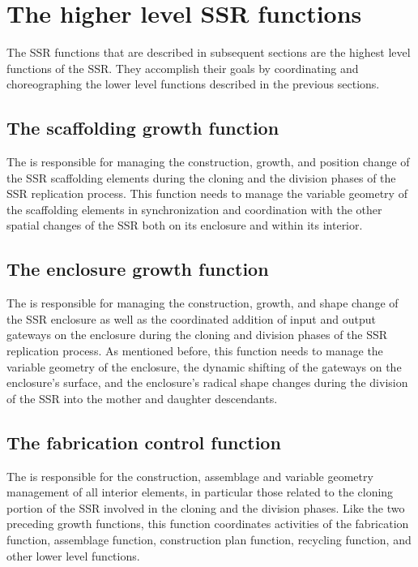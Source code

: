\section[The higher level SSR functions]{The higher level SSR functions}

The SSR functions that are
described in subsequent sections are the highest level functions of the
SSR. They accomplish their goals by coordinating and choreographing the
lower level functions described in the previous sections.

\subsection[The scaffolding growth function]{The scaffolding growth function}

The  
is responsible for managing the construction, growth, and
position change of the SSR scaffolding elements during the cloning and
the division phases of the SSR replication process. This function needs to
manage the variable geometry of the scaffolding elements in
synchronization and coordination with the other spatial changes of the
SSR both on its enclosure and within its interior.

\subsection[The enclosure growth function]{The enclosure growth
function}

The  is responsible for managing
the construction, growth, and shape
change of the SSR enclosure as well as the coordinated addition of
input and output gateways on the enclosure during the cloning and
division phases of the SSR replication process. As mentioned before, this
function needs to manage the variable geometry of the enclosure, the
dynamic shifting of the gateways on the enclosure's surface, and the
enclosure's radical shape changes during the division of the SSR
into the mother and daughter descendants.

\subsection[The fabrication control function]{The fabrication control
function}

The  is responsible for the construction, assemblage and variable
geometry management of all interior elements, in particular those
related to the cloning portion of the SSR involved in the cloning and the
division phases.  Like the two preceding growth
functions, this function coordinates activities of the fabrication
function, assemblage function, construction plan function, recycling
function, and other lower level functions. 

